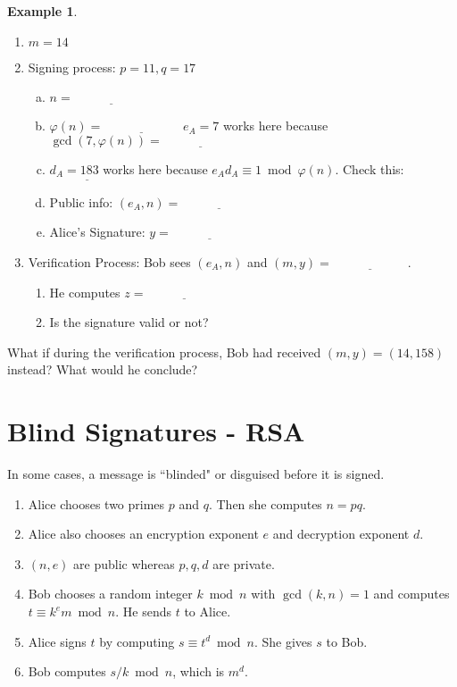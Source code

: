 \documentclass[12pt]{amsart}
\theoremstyle{plain}
\theoremstyle{definition}
\newtheorem*{ex}{Example}
\theoremstyle{remark}
\begin{document}
\newpage \begin{ex}
\begin{enumerate}[1.]
	\item[] $m = 14$
	\item Signing process: $p = 11, q = 17$
		\begin{enumerate}[a.]
			\item $n = \underline{\hspace{1in}}$
			\item $\varphi(n) = \underline{\hspace{1in}}$
				$e_A = 7$ works here because $\gcd(7,\varphi(n)) =  \underline{\hspace{1in}}$
			\item $d_A =183$ works here because $e_Ad_A \equiv 1 \bmod \varphi(n)$.  Check this:  $\underline{\hspace{1in}}$
			\item Public info: $(e_A, n)= \underline{\hspace{1in}}$
			\item Alice's Signature: $y = \underline{\hspace{1in}}$
		\end{enumerate}
	\item Verification Process: Bob sees $(e_A, n)$ and $(m,y) = \underline{\hspace{1in}}$.
		\begin{enumerate}
			\item He computes $z = \underline{\hspace{1in}}$
			\item Is the signature valid or not?\\
		\end{enumerate}
\end{enumerate}
What if during the verification process, Bob had received $(m,y) = (14,158)$ instead?  What would he conclude?
\vspace{.5in}
\end{ex}

\section{Blind Signatures - RSA}
In some cases, a message is ``blinded" or disguised before it is signed.


\begin{framed}
\begin{enumerate}[1.]
	\item Alice chooses two primes $p$ and $q$.  Then she computes $n = pq$.
	\item Alice also chooses an encryption exponent $e$ and decryption exponent $d$.
	\item $(n,e)$ are public whereas $p,q,d$ are private.
	\item Bob chooses a random integer $k \bmod n$ with $\gcd(k,n) = 1$ and computes $t \equiv k^e m \bmod n$.  He sends $t$ to Alice.
	\item Alice signs $t$ by computing $s \equiv t^d \bmod n$.  She gives $s$ to Bob.
	\item Bob computes $s/k \bmod n$, which is $m^d$.
\end{enumerate}
\end{framed}
\end{document}
